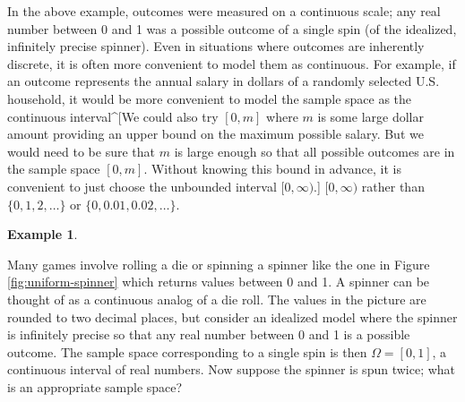 \documentclass[
]{book}
\theoremstyle{definition}
\theoremstyle{definition}
\newtheorem{example}{Example}[chapter]
\theoremstyle{definition}
\theoremstyle{remark}
\begin{document}
In the above example, outcomes were measured on a continuous scale; any real number between 0 and 1 was a possible outcome of a single spin (of the idealized, infinitely precise spinner). Even in situations where outcomes are inherently discrete, it is often more convenient to model them as continuous. For example, if an outcome represents the annual salary in dollars of a randomly selected U.S. household, it would be more convenient to model the sample space as the continuous interval\^{}{[}We could also try \([0, m]\) where \(m\) is some large dollar amount providing an upper bound on the maximum possible salary. But we would need to be sure that \(m\) is large enough so that all possible outcomes are in the sample space \([0, m]\). Without knowing this bound in advance, it is convenient to just choose the unbounded interval \([0, \infty)\).{]} \([0, \infty)\) rather than \(\{0, 1, 2, \ldots\}\) or \(\{0, 0.01, 0.02, \ldots\}\).

\begin{example}
\protect\hypertarget{exm:uniform-outcome}{}{\label{exm:uniform-outcome} }

Many games involve rolling a die or spinning a spinner like the one in Figure \ref{fig:uniform-spinner} which returns values between 0 and 1. A spinner can be thought of as a continuous analog of a die roll. The values in the picture are rounded to two decimal places, but consider an idealized model where the spinner is infinitely precise so that any real number between 0 and 1 is a possible outcome. The sample space corresponding to a single spin is then \(\Omega = [0, 1]\), a continuous interval of real numbers. Now suppose the spinner is spun twice; what is an appropriate sample space?
\end{example}
\end{document}
